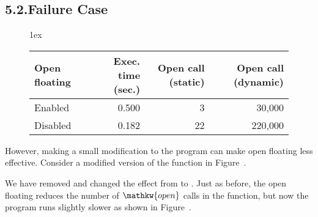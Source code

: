 \documentclass{llncs}
\begin{document}
\subsection{5.2.\hspace*{0.5em}Failure Case}%

\begin{figure}[tbp]%
\begin{mdflushleft}%
\begin{mdtabular}{4}{}{1ex}%
\begin{tabular}{lrrr}\midrule
{\bfseries Open floating}&\multicolumn{1}{|r}{{\bfseries Exec. time (sec.)}}&{\bfseries Open call (static)}&{\bfseries Open call (dynamic)}\\

\midrule
Enabled&\multicolumn{1}{|r}{0.500}&3&30,000\\
Disabled&\multicolumn{1}{|r}{0.182}&22&220,000\\
\midrule
\end{tabular}\end{mdtabular}

\mdhr{}%

\noindent{}%
\end{mdflushleft}%
\end{figure}%

\noindent However, making a small modification to the program can make
open floating less effective. 
Consider a modified version of the  function in Figure~.%
\noindent We have removed  and changed the effect from  to .
Just as before, the open floating reduces the number of $\mathpre{\mathkw{open}}$ calls in the  function, but now the program runs slightly slower as shown in Figure~.
\end{document}
